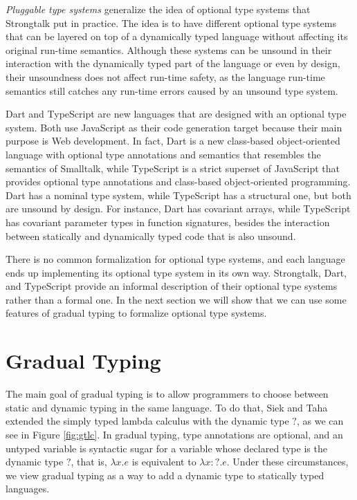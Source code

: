 \emph{Pluggable type systems} \cite{bracha2004pluggable} generalize
the idea of optional type systems that Strongtalk put in practice.
The idea is to have different optional type systems that can be layered
on top of a dynamically typed language without affecting its original
run-time semantics.
Although these systems can be unsound in their interaction with the
dynamically typed part of the language or even by design, their
unsoundness does not affect run-time safety, as the language run-time
semantics still catches any run-time errors caused by an unsound
type system.

Dart \cite{dart} and TypeScript \cite{typescript} are new
languages that are designed with an optional type system.
Both use JavaScript as their code generation target because
their main purpose is Web development.
In fact, Dart is a new class-based object-oriented language with
optional type annotations and semantics that resembles the
semantics of Smalltalk, while TypeScript is a strict superset of
JavaScript that provides optional type annotations and class-based
object-oriented programming.
Dart has a nominal type system, while TypeScript has a structural
one, but both are unsound by design.
For instance, Dart has covariant arrays, while TypeScript has
covariant parameter types in function signatures,
besides the interaction between statically and dynamically
typed code that is also unsound.

There is no common formalization for optional type systems, and
each language ends up implementing its optional type system in
its own way.
Strongtalk, Dart, and TypeScript provide an informal description of
their optional type systems rather than a formal one.
In the next section we will show that we can use some features
of gradual typing \cite{siek2006gradual,siek2007objects} to
formalize optional type systems.

\section{Gradual Typing}
\label{sec:gradual}

The main goal of gradual typing \cite{siek2006gradual} is to allow
programmers to choose between static and dynamic typing in the same
language.
To do that, Siek and Taha \cite{siek2006gradual} extended the simply
typed lambda calculus with the dynamic type $?$, as we can see in
Figure \ref{fig:gtlc}.
In gradual typing, type annotations are optional, and an untyped
variable is syntactic sugar for a variable whose declared type is
the dynamic type $?$, that is, $\lambda x.e$ is equivalent to $\lambda x{:}?.e$.
Under these circumstances, we view gradual typing as a way to add
a dynamic type to statically typed languages.

